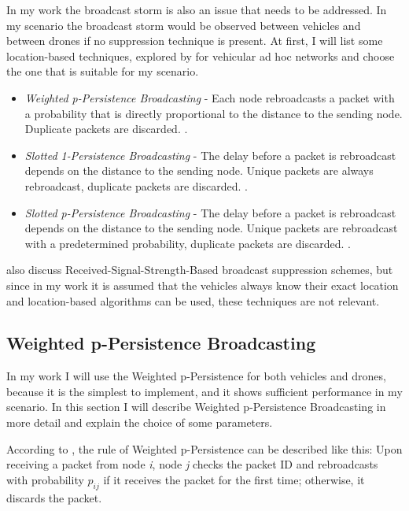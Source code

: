 \documentclass[]{nsm-thesis}
\begin{document}
In my work the broadcast storm is also an issue that needs to be addressed. In my scenario the broadcast storm would be observed between vehicles and between drones if no suppression technique is present. At first, I will list some location-based techniques, explored by \textcite{wisitrophan2007} for vehicular ad hoc networks and choose the one that is suitable for my scenario.

\begin{itemize}

\item \emph{Weighted p-Persistence Broadcasting} - Each node rebroadcasts a packet with a probability that is directly proportional to the distance to the sending node. Duplicate packets are discarded. \cite[Page~88]{wisitrophan2007}.

\item \emph{Slotted 1-Persistence Broadcasting} - The delay before a packet is rebroadcast depends on the distance to the sending node. Unique packets are always rebroadcast, duplicate packets are discarded. \cite[Page~88]{wisitrophan2007}.

\item \emph{Slotted p-Persistence Broadcasting} - The delay before a packet is rebroadcast depends on the distance to the sending node. Unique packets are rebroadcast with a predetermined probability, duplicate packets are discarded. \cite[Page~89]{wisitrophan2007}.

\end{itemize}

\textcite{wisitrophan2007} also discuss Received-Signal-Strength-Based broadcast suppression schemes, but since in my work it is assumed that the vehicles always know their exact location and location-based algorithms can be used, these techniques are not relevant.

\subsection{Weighted p-Persistence Broadcasting}

In my work I will use the Weighted p-Persistence for both vehicles and drones, because it is the simplest to implement, and it shows sufficient performance in my scenario. In this section I will describe Weighted p-Persistence Broadcasting in more detail and explain the choice of some parameters.

According to \textcite{wisitrophan2007}, the rule of Weighted p-Persistence can be described like this: Upon receiving a packet from node \emph{i}, node \emph{j} checks the packet ID and rebroadcasts with probability $p_{ij}$ if it receives the packet for the first time; otherwise, it discards the packet.
\end{document}
